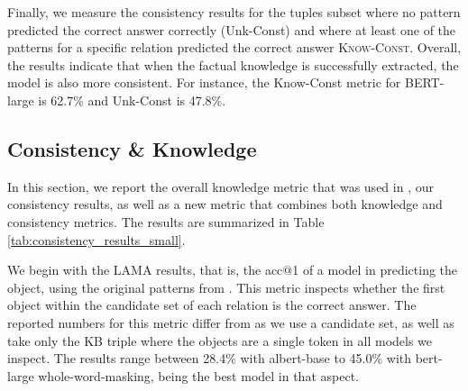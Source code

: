 Finally, we measure the consistency results for the tuples
subset where no pattern predicted the correct answer correctly (Unk-Const) and where at least one of the patterns for a specific
relation predicted the correct answer \textsc{Know-Const}.
Overall, the results indicate that when the factual knowledge is successfully extracted, the model is also more consistent.
For instance, the Know-Const metric for BERT-large is 62.7\% and Unk-Const is 47.8\%. 


\subsection{Consistency \& Knowledge}

In this section, we report the overall knowledge metric that was used in \citet{lama}, our consistency results, as well as a new metric that combines both knowledge and consistency metrics.
The results are summarized in Table \ref{tab:consistency_results_small}.

We begin with the LAMA results, that is, the acc@1 of a model in predicting the object, using the original patterns from \citet{lama}. This metric inspects whether the first object within the candidate set of each relation is the correct answer. The reported numbers for this metric differ from \citet{lama} as we use a candidate set, as well as take only the KB triple where the objects are a single token in all models we inspect. The results range between 28.4\% with albert-base to 45.0\% with bert-large whole-word-masking, being the best model in that aspect.

